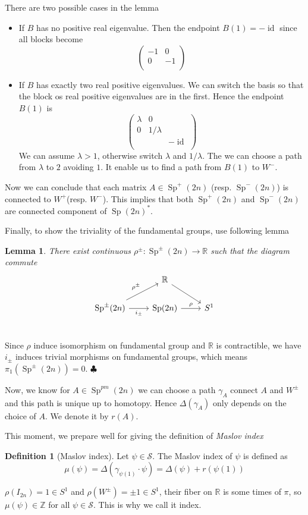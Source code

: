 \documentclass[a4paper,11pt]{amsart}
\renewcommand{\qed}{\hfill\ensuremath{\clubsuit}}
\DeclareMathOperator{\Sp}{Sp}
\DeclareMathOperator{\id}{id}
\theoremstyle{plain}
\newtheorem{lemma}{Lemma}[subsection]
\theoremstyle{theorem}
\theoremstyle{definition}
\newtheorem{defn}{Definition}[subsection]
\begin{document}
There are two possible cases in the lemma 
\begin{itemize}
	\item If $B$ has no positive real eigenvalue. Then the endpoint $B(1) = -\id$ since all blocks become
	\[
	\begin{pmatrix}
	-1&0\\
	0& -1\\
	\end{pmatrix}
	\]
	\item If $B$ has exactly two real positive eigenvalues. We can switch the basis so that the block os real positive eigenvalues are in the first. Hence the endpoint $B(1)$ is 
	\[
	\begin{pmatrix}
	\lambda &0 & \\
	0 & 1/\lambda& \\
	& & -\id \\
	\end{pmatrix}
	\] 
	We can assume $\lambda > 1$, otherwise switch $\lambda$ and $1/\lambda$. The we can choose a path from $\lambda$ to $2$ avoiding $1$. It enable us to find a path from $B(1)$ to $W^-$.
\end{itemize}
Now we can conclude that each matrix $A \in \Sp^+(2n)$ (resp. $\Sp^-(2n)$) is connected to $W^+$(resp. $W^-$). This implies that both $\Sp^+(2n)$ and $\Sp^{-}(2n)$ are connected component of $\Sp(2n)^*$.

Finally, to show the triviality of the fundamental groups, use following lemma
\begin{lemma}
	There exist continuous $\rho^{\pm} \colon \Sp^{\pm}(2n) \to \mathbb{R}$ such that the diagram commute
	\[
	\begin{tikzcd}
	& \mathbb{R} \ar[dr] & \\
	\Sp^{\pm}(2n) \ar[r,"i_{\pm}"'] \ar[ru,"\rho^{\pm}"]& \Sp(2n) \ar[r,"\rho"]& S^1\\
	\end{tikzcd}
	\]
\end{lemma}
Since $\rho$ induce isomorphism on fundamental group and $\mathbb{R}$ is contractible, we have $i_{\pm}$ induces trivial morphisms on fundamental groups, which means $\pi_1(\Sp^{\pm}(2n))= 0$. 
\qed

Now, we know for $A \in \Sp^{pm}(2n)$ we can choose a path $\gamma_A$ connect $A$ and $W^{\pm}$ and this path is unique up to homotopy. Hence $\Delta(\gamma_A)$ only depends on the choice of $A$. We denote it by $r(A)$. 

This moment, we prepare well for giving the definition of \emph{Maslov index}
\begin{defn}[Maslov index]
Let $\psi \in \mathcal{S}$. The Maslov index of $\psi$ is defined as
\[
 \mu(\psi) = \Delta(\gamma_{\psi(1)} \cdot \psi)= \Delta(\psi) + r(\psi(1))
\]	
\end{defn}
$\rho(I_{2n}) = 1 \in 
S^1$ and $\rho(W^{\pm}) = \pm 1 \in 
S^1$, their fiber on $\mathbb{R}$ is some times of $\pi$, so $\mu(\psi) \in \mathbb{Z}$ for all $\psi \in \mathcal{S}$. This is why we call it index.
\end{document}
